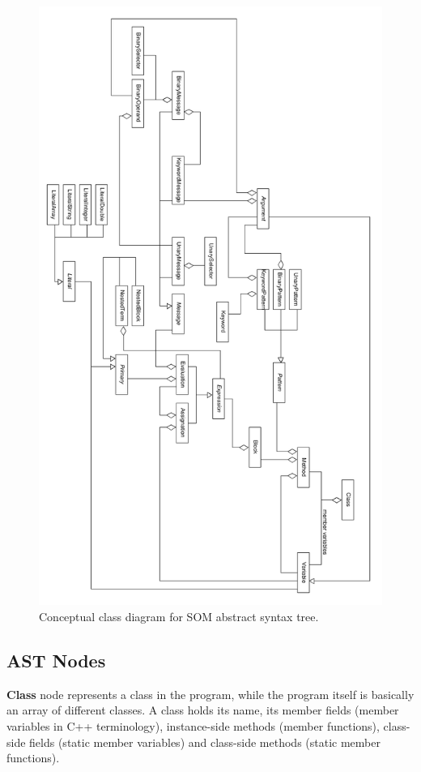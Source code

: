 \documentclass[thesis=M,english]{FITthesis}[2019/12/23]
\begin{document}
\begin{figure}[hp!]
	\centering
	\includegraphics[width=\textwidth, height=\textheight]{media/ast/ast_concept.png}
	\caption{Conceptual class diagram for SOM abstract syntax tree.}
	\label{fig:ast_class_concept}
\end{figure}


\subsection{AST Nodes}
\textbf{Class} node represents a class in the program, while the program itself is basically an array of different classes. A class
holds its name, its member fields (member variables in C++ terminology), instance-side methods (member functions), class-side fields
(static member variables) and class-side methods (static member functions).
\end{document}
